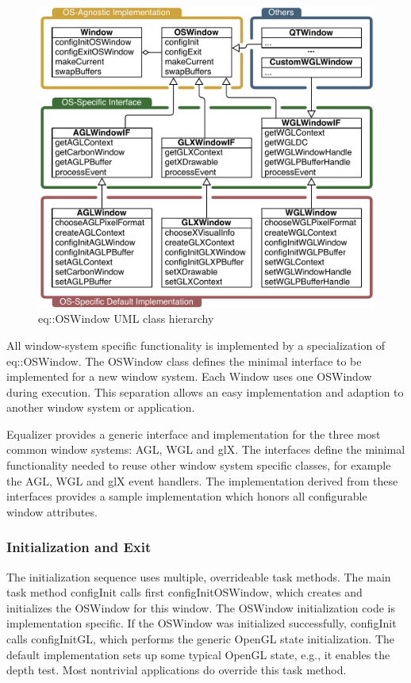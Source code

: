 \documentclass[10pt,a4]{scrartcl}
\begin{document}
\begin{figure}
  \includegraphics[width=.618\textwidth]{images/osWindow.pdf}
  {\caption{\label{fOSWindow}eq::OSWindow UML class hierarchy}}
\end{figure}
All window-system specific functionality is implemented by a
specialization of \textsf{eq::OS\-Window}. The \textsf{OSWindow} class
defines the minimal interface to be implemented for a new window
system. Each \textsf{Window} uses one \textsf{OSWindow} during
execution. This separation allows an easy implementation and adaption to
another window system or application.

Equalizer provides a generic interface and implementation for the three
most common window systems: AGL, WGL and glX. The interfaces define the
minimal functionality needed to reuse other window system specific
classes, for example the AGL, WGL and glX event handlers. The
implementation derived from these interfaces provides a sample
implementation which honors all configurable window attributes.

\subsubsection{Initialization and Exit}

The initialization sequence uses multiple, overrideable task
methods. The main task method \textsf{configInit} calls first
\textsf{configInitOSWindow}, which creates and initializes the
\textsf{OSWindow} for this window. The \textsf{OSWindow} initialization
code is implementation specific. If the \textsf{OSWindow} was
initialized successfully, \textsf{configInit} calls
\textsf{configInitGL}, which performs the generic OpenGL state
initialization. The default implementation sets up some typical OpenGL
state, e.g., it enables the depth test. Most nontrivial applications
do override this task method.
\end{document}
